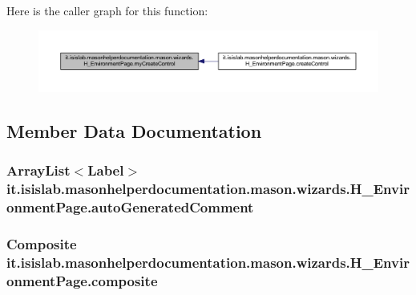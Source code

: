 Here is the caller graph for this function\-:\nopagebreak
\begin{figure}[H]
\begin{center}
\leavevmode
\includegraphics[width=350pt]{classit_1_1isislab_1_1masonhelperdocumentation_1_1mason_1_1wizards_1_1_h___environment_page_a09a8404f1e96b68ec8bcb29a3da65558_icgraph}
\end{center}
\end{figure}




\subsection{Member Data Documentation}
\hypertarget{classit_1_1isislab_1_1masonhelperdocumentation_1_1mason_1_1wizards_1_1_h___environment_page_a5495002868c1d72f31f79a3e584fdd60}{
\subsubsection[{auto\-Generated\-Comment}]{\setlength{\rightskip}{0pt plus 5cm}Array\-List$<$Label$>$ it.\-isislab.\-masonhelperdocumentation.\-mason.\-wizards.\-H\-\_\-\-Environment\-Page.\-auto\-Generated\-Comment\hspace{0.3cm}{\ttfamily [private]}}}\label{classit_1_1isislab_1_1masonhelperdocumentation_1_1mason_1_1wizards_1_1_h___environment_page_a5495002868c1d72f31f79a3e584fdd60}
\hypertarget{classit_1_1isislab_1_1masonhelperdocumentation_1_1mason_1_1wizards_1_1_h___environment_page_acd16b35445be03e0527a45d03cf61573}{
\subsubsection[{composite}]{\setlength{\rightskip}{0pt plus 5cm}Composite it.\-isislab.\-masonhelperdocumentation.\-mason.\-wizards.\-H\-\_\-\-Environment\-Page.\-composite\hspace{0.3cm}{\ttfamily [private]}}}\label{classit_1_1isislab_1_1masonhelperdocumentation_1_1mason_1_1wizards_1_1_h___environment_page_acd16b35445be03e0527a45d03cf61573}
